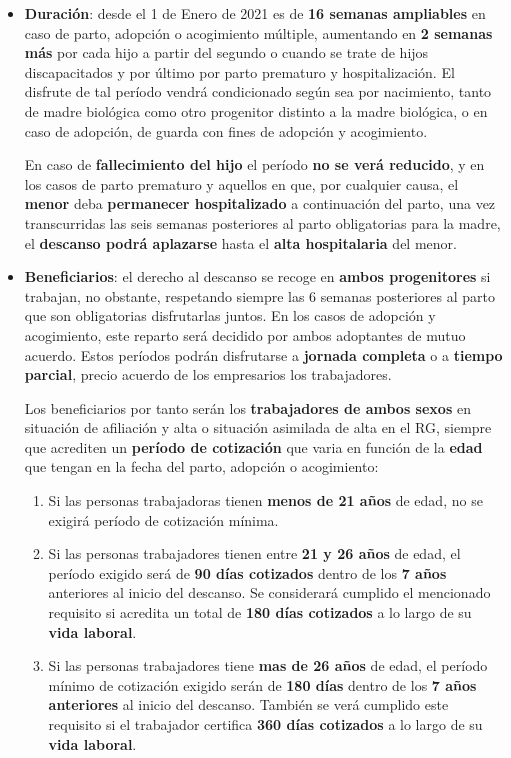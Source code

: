 \begin{itemize}
    \item \textbf{Duración}: desde el 1 de Enero de 2021 es de \textbf{16 semanas ampliables} en caso de parto, adopción o acogimiento múltiple, aumentando en \textbf{2 semanas más} por cada hijo a partir del segundo o cuando se trate de hijos discapacitados y por último por parto prematuro y hospitalización. El disfrute de tal período vendrá condicionado según sea por nacimiento, tanto de madre biológica como otro progenitor distinto a la madre biológica, o en caso de adopción, de guarda con fines de adopción y acogimiento.

    En caso de \textbf{fallecimiento del hijo} el período \textbf{no se verá reducido}, y en los casos de parto prematuro y aquellos en que, por cualquier causa, el \textbf{menor} deba \textbf{permanecer hospitalizado} a continuación del parto, una vez transcurridas las seis semanas posteriores al parto obligatorias para la madre, el \textbf{descanso podrá aplazarse} hasta el \textbf{alta hospitalaria} del menor.

    \item \textbf{Beneficiarios}: el derecho al descanso se recoge en \textbf{ambos progenitores} si trabajan, no obstante, respetando siempre las 6 semanas posteriores al parto que son obligatorias disfrutarlas juntos. En los casos de adopción y acogimiento, este reparto será decidido por ambos adoptantes de mutuo acuerdo. Estos períodos podrán disfrutarse a \textbf{jornada completa} o a \textbf{tiempo parcial}, precio acuerdo de los empresarios los trabajadores.

    Los beneficiarios por tanto serán los \textbf{trabajadores de ambos sexos} en situación de afiliación y alta o situación asimilada de alta en el RG, siempre que acrediten un \textbf{período de cotización} que varia en función de la \textbf{edad} que tengan en la fecha del parto, adopción o acogimiento:

    \begin{enumerate}
        \item Si las personas trabajadoras tienen \textbf{menos de 21 años} de edad, no se exigirá período de cotización mínima.
        \item Si las personas trabajadores tienen entre \textbf{21 y 26 años} de edad, el período exigido será de \textbf{90 días cotizados} dentro de los \textbf{7 años} anteriores al inicio del descanso. Se considerará cumplido el mencionado requisito si acredita un total de \textbf{180 días cotizados} a lo largo de su \textbf{vida laboral}.
        \item Si las personas trabajadores tiene \textbf{mas de 26 años} de edad, el período mínimo de cotización exigido serán de \textbf{180 días} dentro de los \textbf{7 años anteriores} al inicio del descanso. También se verá cumplido este requisito si el trabajador certifica \textbf{360 días cotizados} a lo largo de su \textbf{vida laboral}.
    \end{enumerate}


\end{itemize}
